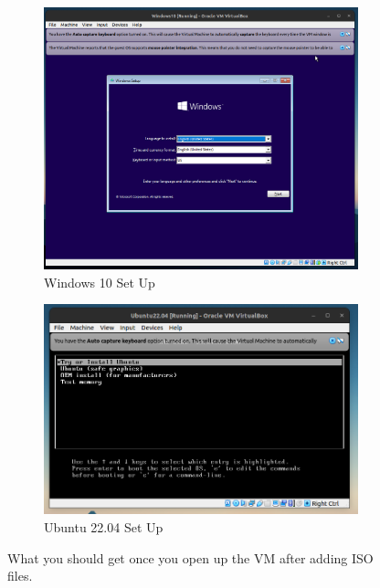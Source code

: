 \documentclass{article}
\begin{document}
  \begin{figure}[hbt!]
      \centering 
      \begin{subfigure}[b]{0.45\textwidth}
      \centering
          \includegraphics[width=\textwidth]{img/VM_Windows1.png}
          \caption{Windows 10 Set Up}
          \label{fig:VM_Windows1}
      \end{subfigure}
      \hfill 
      \begin{subfigure}[b]{0.45\textwidth}
      \centering
          \includegraphics[width=\textwidth]{img/VM_Ubuntu1.png}
          \caption{Ubuntu 22.04 Set Up}
          \label{fig:VM_Ubuntu1}
      \end{subfigure}
      \caption{What you should get once you open up the VM after adding ISO files. }
  \end{figure}
\end{document}
